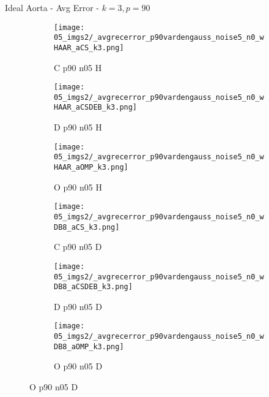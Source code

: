 \begin{frame}{Ideal Aorta - Avg Error - $k=3,p=90$}{}
\begin{figure}
\begin{subfigure}{0.13\textwidth}
\texttt{[image: 05\_imgs2/\_avgrecerror\_p90vardengauss\_noise5\_n0\_wHAAR\_aCS\_k3.png]}
\caption*{\tiny C p90 n05 H}
\end{subfigure}
\begin{subfigure}{0.13\textwidth}
\texttt{[image: 05\_imgs2/\_avgrecerror\_p90vardengauss\_noise5\_n0\_wHAAR\_aCSDEB\_k3.png]}
\caption*{\tiny D p90 n05 H}
\end{subfigure}
\begin{subfigure}{0.13\textwidth}
\texttt{[image: 05\_imgs2/\_avgrecerror\_p90vardengauss\_noise5\_n0\_wHAAR\_aOMP\_k3.png]}
\caption*{\tiny O p90 n05 H}
\end{subfigure}
\begin{subfigure}{0.13\textwidth}
\texttt{[image: 05\_imgs2/\_avgrecerror\_p90vardengauss\_noise5\_n0\_wDB8\_aCS\_k3.png]}
\caption*{\tiny C p90 n05 D}
\end{subfigure}
\begin{subfigure}{0.13\textwidth}
\texttt{[image: 05\_imgs2/\_avgrecerror\_p90vardengauss\_noise5\_n0\_wDB8\_aCSDEB\_k3.png]}
\caption*{\tiny D p90 n05 D}
\end{subfigure}
\begin{subfigure}{0.13\textwidth}
\texttt{[image: 05\_imgs2/\_avgrecerror\_p90vardengauss\_noise5\_n0\_wDB8\_aOMP\_k3.png]}
\caption*{\tiny O p90 n05 D}
\end{subfigure}

\vspace{5pt}


\end{figure}
\end{frame}
